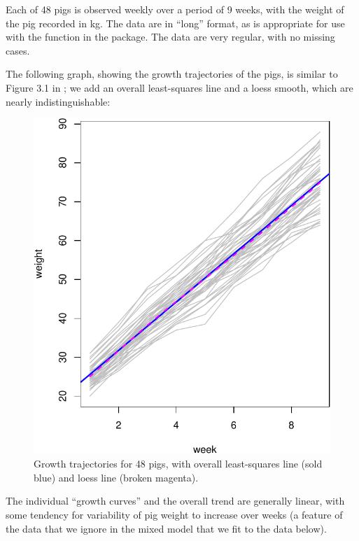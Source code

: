 \documentclass[
]{jss}
\begin{document}
Each of 48 pigs is observed weekly over a period of 9 weeks, with the
weight of the pig recorded in kg. The data are in ``long'' format, as is
appropriate for use with the  function in the 
package. The data are very regular, with no missing cases.

The following graph, showing the growth trajectories of the pigs, is
similar to Figure 3.1 in \citet{DiggleLiangZeger:1994}; we add an
overall least-squares line and a loess smooth, which are nearly
indistinguishable:

\begin{CodeChunk}
\begin{figure}

{\centering \includegraphics[width=0.6\linewidth]{JSS-article_files/figure-latex/pigs-graph-1} 

}

\caption[Growth trajectories for 48 pigs, with overall least-squares line (sold blue) and loess line (broken magenta)]{Growth trajectories for 48 pigs, with overall least-squares line (sold blue) and loess line (broken magenta).}\label{fig:pigs-graph}
\end{figure}
\end{CodeChunk}

The individual ``growth curves'' and the overall trend are generally
linear, with some tendency for variability of pig weight to increase
over weeks (a feature of the data that we ignore in the mixed model that
we fit to the data below).
\end{document}

